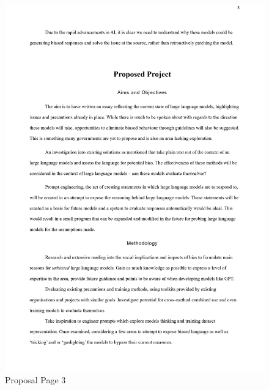 \documentclass[12pt]{article}
\begin{document}
\begin{figure}[H]
    \centering
    \includegraphics[width=0.85\linewidth]{Images/0003.jpg}
    \caption{Proposal Page 3}
    
\end{figure}
\end{document}
